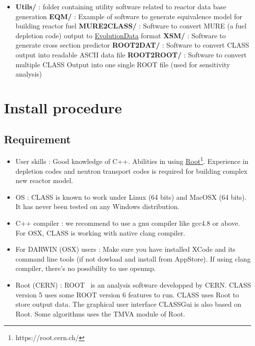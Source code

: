 \begin{itemize}
\item \textbf{Utils/} : folder containing utility software related to reactor data base generation
\subitem \textbf{EQM/} : Example of software to generate equivalence model for building reactor fuel
\subitem \textbf{MURE2CLASS/} : Software to convert MURE (a fuel depletion code)  output to \hyperref[sec:EvolutionData]{EvolutionData} format
\subitem \textbf{XSM/} : Software to generate cross section predictor
\subitem \textbf{ROOT2DAT/} : Software to convert CLASS output into readable ASCII data file
\subitem \textbf{ROOT2ROOT/} : Software to convert multiple CLASS Output into one single ROOT file (used for sensitivity analysis)
 
 
\end{itemize}

\chapter{Install procedure}

\section{Requirement}

\begin{itemize}
\item User skills : Good knowledge of C++. Abilities in using \href{https://root.cern.ch/}{Root}\footnote{https://root.cern.ch/}.
Experience in depletion codes and neutron transport codes is required for building complex new reactor model.
\item OS : CLASS is known to work under Linux (64  bits) and MacOSX (64 bits). It  has never been tested on any Windows distribution.
\item C++ compiler :  we recommend to use a gnu compiler like gcc4.8 or above. For OSX, CLASS is working with native clang compiler.
\item For DARWIN (OSX) users : 
Make sure you have installed XCode and its command line tools (if not dowload and install from AppStore). If using clang compiler, there's no possibility to use openmp. 
\item Root (CERN) :  
ROOT~\cite{Brun_1997} is an analysis software developped by CERN. CLASS version 5 uses some ROOT version 6 features to run. CLASS uses Root to store output data. The graphical user interface CLASSGui is also based on Root. Some algorithms uses the TMVA module of Root. 
\end{itemize}

